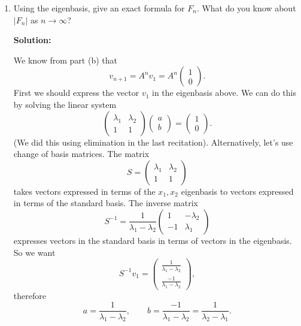 \documentclass[11pt]{article}
\begin{document}
\begin{enumerate}
\begin{enumerate}




\item Using the eigenbasis, give an exact formula for $F_n$.  What do you know about $|F_n|$ as $n \to \infty$?

\textbf{Solution:} 

We know from part (b) that
\[v_{n+1} = A^{n} v_1 = A^{n} \begin{pmatrix} 1 \\ 0 \end{pmatrix}. \]
First we should express the vector $v_1$ in the eigenbasis above.  We can do this by solving the linear system 
\[\begin{pmatrix} \lambda_1 & \lambda_2 \\ 1 & 1 \end{pmatrix} \begin{pmatrix} a \\ b \end{pmatrix}  = \begin{pmatrix}1 \\ 0 \end{pmatrix}. \]
(We did this using elimination in the last recitation).  Alternatively, let's use change of basis matrices.  The matrix
\[S = \begin{pmatrix} \lambda_1 & \lambda_2 \\ 1 & 1 \end{pmatrix} \]
takes vectors expressed in terms of the $x_1, x_2$ eigenbasis to vectors expressed in terms of the standard basis.  The inverse matrix
\[S^{-1} = \frac{1}{\lambda_1 - \lambda_2}\begin{pmatrix} 1 & -\lambda_2 \\ -1 & \lambda_1 \end{pmatrix} \]
expresses vectors in the standard basis in terms of vectors in the eigenbasis.  So we want
\[S^{-1}v_1 = \begin{pmatrix} \frac{1}{\lambda_1-\lambda_2} \\ \frac{-1}{\lambda_1 - \lambda_2} \end{pmatrix}, \]
therefore
\[a = \frac{1}{\lambda_1-\lambda_2} , \qquad b = \frac{-1}{\lambda_1 - \lambda_2} = \frac{1}{\lambda_2 - \lambda_1}.\]



\end{enumerate}
\end{enumerate}
\end{document}
